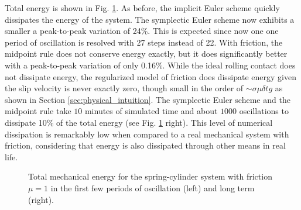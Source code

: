 Total energy is shown in Fig. \ref{fig:spring_cylinder_energy}. As before, the
implicit Euler scheme quickly dissipates the energy of the system. The
symplectic Euler scheme now exhibits a smaller a peak-to-peak variation of 24\%.
This is expected since now one one period of oscillation is resolved with 27
steps instead of 22. With friction, the midpoint rule does not conserve energy
exactly, but it does significantly better with a peak-to-peak variation of only
0.16\%. While the ideal rolling contact does not dissipate energy, the
regularized model of friction does dissipate energy given the slip velocity is
never exactly zero, though small in the order of $\sim\sigma\mu\delta t g$ as shown
in Section \ref{sec:physical_intuition}. The symplectic Euler scheme and the
midpoint rule take $10$ minutes of simulated time and about $1000$ oscillations
to dissipate 10\% of the total energy (see Fig. \ref{fig:spring_cylinder_energy}
right). This level of numerical dissipation is remarkably low when compared to a
real mechanical system with friction, considering that energy is also dissipated
through other means in real life.
\begin{figure}[!h]
    \centering
    \caption{\label{fig:spring_cylinder_energy} 
    Total mechanical energy for the spring-cylinder system with friction $\mu=1$
    in the first few periods of oscillation (left) and long term (right).}
\end{figure}

